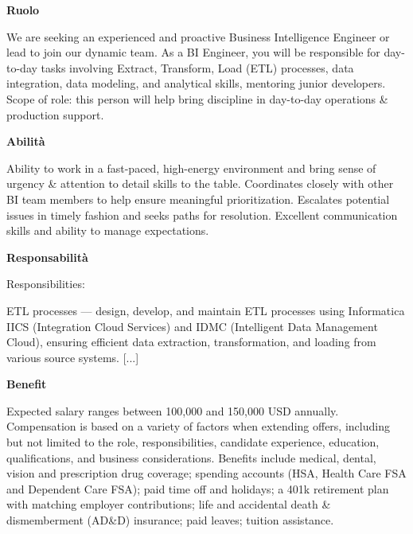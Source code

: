 \noindent\textbf{\textcolor{roleColor}{Ruolo}}\par
\noindent We are seeking an experienced and proactive Business Intelligence Engineer or lead to join our dynamic team. As a BI Engineer, you will be responsible for day-to-day tasks involving Extract, Transform, Load (ETL) processes, data integration, data modeling, and analytical skills, mentoring junior developers. Scope of role: this person will help bring discipline in day-to-day operations \& production support.\par
\noindent{\color{roleColor}\rule{\textwidth}{0.6pt}}\par\medskip

\noindent\textbf{\textcolor{skillColor}{Abilità}}\par
\noindent Ability to work in a fast-paced, high-energy environment and bring sense of urgency \& attention to detail skills to the table. Coordinates closely with other BI team members to help ensure meaningful prioritization. Escalates potential issues in timely fashion and seeks paths for resolution. Excellent communication skills and ability to manage expectations.\par
\noindent{\color{skillColor}\rule{\textwidth}{0.6pt}}\par\medskip

\noindent\textbf{\textcolor{responsibilityColor}{Responsabilità}}\par
\noindent Responsibilities:\par\smallskip
ETL processes — design, develop, and maintain ETL processes using Informatica IICS (Integration Cloud Services) and IDMC (Intelligent Data Management Cloud), ensuring efficient data extraction, transformation, and loading from various source systems. [...]\par
\noindent{\color{responsibilityColor}\rule{\textwidth}{0.6pt}}\par\medskip

\noindent\textbf{\textcolor{benefitColor}{Benefit}}\par
\noindent Expected salary ranges between 100,000 and 150,000 USD annually. Compensation is based on a variety of factors when extending offers, including but not limited to the role, responsibilities, candidate experience, education, qualifications, and business considerations. Benefits include medical, dental, vision and prescription drug coverage; spending accounts (HSA, Health Care FSA and Dependent Care FSA); paid time off and holidays; a 401k retirement plan with matching employer contributions; life and accidental death \& dismemberment (AD\&D) insurance; paid leaves; tuition assistance.\par
\noindent{\color{benefitColor}\rule{\textwidth}{0.6pt}}\par\medskip

